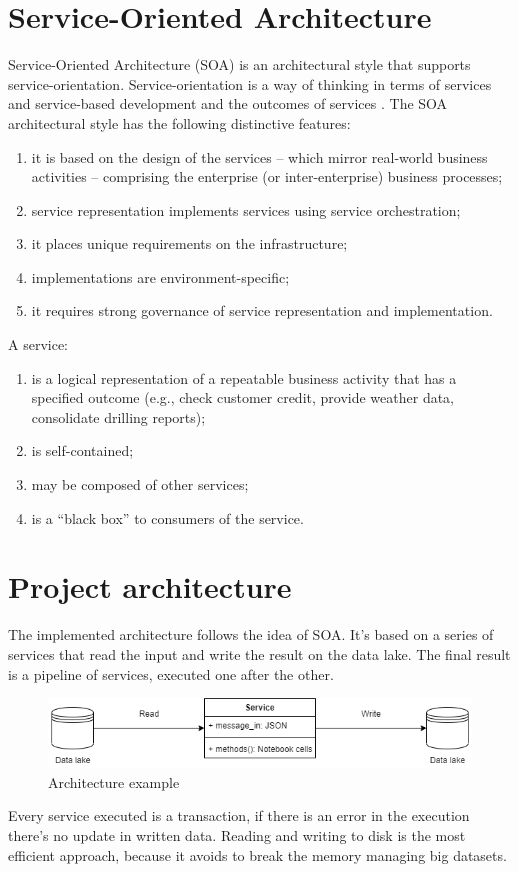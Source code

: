 \documentclass[\main/main.tex]{subfiles}
\begin{document}
\section{Service-Oriented Architecture}
Service-Oriented Architecture (SOA) is an architectural style that supports service-orientation. Service-orientation is a way of thinking in terms of services and service-based development and the outcomes of services \cite{soa_definition}. The SOA architectural style has the following distinctive features:
\begin{enumerate}
    \item it is based on the design of the services – which mirror real-world business activities – comprising the enterprise (or inter-enterprise) business processes;
    \item service representation implements services using service orchestration;
    \item it places unique requirements on the infrastructure;
    \item implementations are environment-specific;
    \item it requires strong governance of service representation and implementation.
\end{enumerate}
A service:
\begin{enumerate}
    \item is a logical representation of a repeatable business activity that has a specified outcome (e.g., check customer credit, provide weather data, consolidate drilling reports);
    \item is self-contained;
    \item may be composed of other services;
    \item is a “black box” to consumers of the service.
\end{enumerate}

\section{Project architecture}
The implemented architecture follows the idea of SOA. It's based on a series of services that read the input and write the result on the data lake. The final result is a pipeline of services, executed one after the other.
\begin{figure}[H]
    \centering
    \includegraphics[width=\textwidth]{images/architecture/architecture_service_example.png}
    \caption{Architecture example}
    \label{fig:architecture_example}
\end{figure}
Every service executed is a transaction, if there is an error in the execution there's no update in written data. Reading and writing to disk is the most efficient approach, because it avoids to break the memory managing big datasets. 
\end{document}
